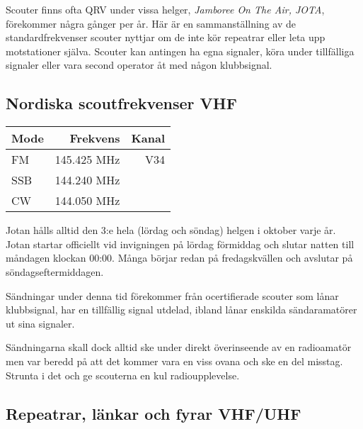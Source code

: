 Scouter finns ofta QRV under vissa helger, \textit{Jamboree On The Air, JOTA},
förekommer några gånger per år. Här är en sammanställning av de
standardfrekvenser scouter nyttjar om de inte kör repeatrar eller leta upp
motstationer själva. Scouter kan antingen ha egna signaler, köra under
tillfälliga signaler eller vara second operator åt med någon klubbsignal.

\subsection{Nordiska scoutfrekvenser VHF}

\begin{center}
\begin{tabular}{lrr}
	\textbf{Mode} & \textbf{Frekvens} & \textbf{Kanal} \\ \hline
	FM            &      145.425  MHz &   V34 \\
	SSB           &      144.240  MHz &  \\
	CW            &      144.050  MHz &
\end{tabular}
\end{center}

Jotan hålls alltid den 3:e hela (lördag och söndag) helgen i oktober varje år.
Jotan startar officiellt vid invigningen på lördag förmiddag och slutar natten
till måndagen klockan 00:00. Många börjar redan på fredagskvällen och avslutar
på söndagseftermiddagen.

Sändningar under denna tid förekommer från ocertifierade scouter som lånar
klubbsignal, har en tillfällig signal utdelad, ibland lånar enskilda
sändaramatörer ut sina signaler.

Sändningarna skall dock alltid ske under direkt överinseende av en radioamatör
men var beredd på att det kommer vara en viss ovana och ske en del misstag.
Strunta i det och ge scouterna en kul radioupplevelse.

\scriptsize
\subsection{Repeatrar, länkar och fyrar VHF/UHF}
